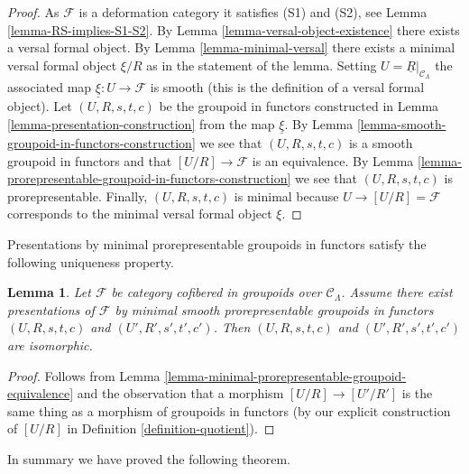 \documentclass{stacks-project}
\theoremstyle{plain}
\newtheorem{lemma}[subsection]{Lemma}
\theoremstyle{definition}
\theoremstyle{remark}
\numberwithin{equation}{subsection}
\begin{document}
\begin{proof}
As $\mathcal{F}$ is a deformation category it satisfies (S1) and (S2), see
Lemma \ref{lemma-RS-implies-S1-S2}.
By
Lemma \ref{lemma-versal-object-existence}
there exists a versal formal object. By
Lemma \ref{lemma-minimal-versal}
there exists a minimal versal formal object $\xi/R$ as in the statement
of the lemma. Setting
$U = \underline{R}|_{\mathcal{C}_\Lambda}$ the
associated map $\underline{\xi} : U \to \mathcal{F}$ is smooth (this is
the definition of a versal formal object).
Let $(U, R, s, t, c)$ be the groupoid in functors constructed in
Lemma \ref{lemma-presentation-construction}
from the map $\underline{\xi}$. By
Lemma \ref{lemma-smooth-groupoid-in-functors-construction}
we see that $(U, R, s, t, c)$ is a smooth groupoid in functors and that
$[U/R] \to \mathcal{F}$ is an equivalence. By
Lemma \ref{lemma-prorepresentable-groupoid-in-functors-construction}
we see that $(U, R, s, t, c)$ is prorepresentable.
Finally, $(U, R, s, t, c)$ is minimal because $U \to [U/R] = \mathcal{F}$
corresponds to the minimal versal formal object $\xi$.
\end{proof}

\noindent
Presentations by minimal prorepresentable groupoids in functors satisfy the
following uniqueness property.

\begin{lemma}
\label{lemma-minimal-presentations-equivalent}
Let $\mathcal{F}$ be category cofibered in groupoids over
$\mathcal{C}_\Lambda$. Assume there exist presentations of
$\mathcal{F}$ by minimal smooth prorepresentable groupoids
in functors $(U, R, s, t, c)$ and $(U', R', s', t', c')$.
Then $(U, R, s, t, c)$ and $(U', R', s', t', c')$ are isomorphic.
\end{lemma}

\begin{proof}
Follows from
Lemma \ref{lemma-minimal-prorepresentable-groupoid-equivalence}
and the observation that a morphism
$[U/R] \to [U'/R']$ is the same thing as a morphism
of groupoids in functors (by our explicit construction of $[U/R]$ in
Definition \ref{definition-quotient}).
\end{proof}

\noindent
In summary we have proved the following theorem.
\end{document}
